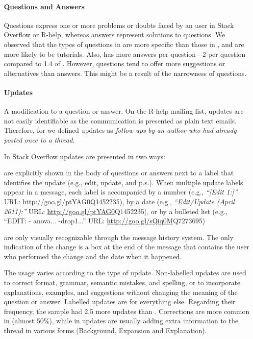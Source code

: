 
\paragraph*{Questions and Answers}
    Questions express one or more problems or doubts faced by an user in Stack Overflow or R-help, whereas answers represent solutions to questions.  We observed that the types of questions in \SO are more specific than those in \RH, and are more likely to be tutorials. Also, \SO has more answers per question---2 per question compared to 1.4 of \RH. However, \RH questions tend to offer more suggestions or alternatives than \SO answers. This might be a result of the narrowness of \SO questions.

\paragraph*{Updates}
	A modification to a question or answer.
	On the R-help mailing list, updates are not easily identifiable as the communication is presented as plain text emails.
	Therefore, for \RH we defined updates  as \emph{follow-ups by an author who had already posted once to a thread}.

	In Stack Overflow updates are presented in two ways:
	\begin{description}[itemsep=3pt, topsep=2pt, leftmargin=1em, parsep=0pt]
		\item[Labelled updates] are explicitly shown in the body of questions or answers next to a label that identifies the update (e.g., edit, update, and p.s.).
		When multiple update labels appear in a message, each label is accompanied by a number (e.g., \textit{``[Edit 1:]''} {\footnotesize URL:  \url{http://goo.gl/ptYAG0}{Q1452235}}), by a date (e.g., \textit{``Edit/Update (April 2011):''} {\footnotesize URL:  \url{http://goo.gl/ptYAG0}{Q1452235}}), or by a bulleted list (e.g., ``EDIT: - anova... -drop1...'' {\footnotesize URL:  \url{http://goo.gl/sQiq0M}{Q7273695}})

		\item[Non-labelled updates] are only visually recognizable through the message history system. The only indication of the change is a box at the end of the message that contains the user who performed the change and the date when it happened.
	\end{description}

	The usage varies according to the type of update.
	Non-labelled updates are used to correct format, grammar, semantic mistakes, and spelling, or to incorporate explanations, examples, and suggestions without changing the meaning of the question or answer. Labelled updates are for everything else. Regarding their frequency,  the \SO sample had 2.5 more updates than \RH.
Corrections are more common in \SO (almost 50\%), while in \RH updates are usually adding extra information to the thread in various forms (Background, Expansion and Explanation).

